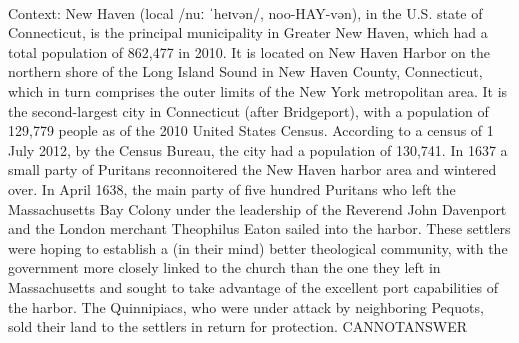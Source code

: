 \documentclass[11pt,a4paper, onecolumn]{article}
\begin{document}
\\ Context: New Haven (local /nuː ˈheɪvən/, noo-HAY-vən), in the U.S. state of Connecticut, is the principal municipality in Greater New Haven, which had a total population of 862,477 in 2010. It is located on New Haven Harbor on the northern shore of the Long Island Sound in New Haven County, Connecticut, which in turn comprises the outer limits of the New York metropolitan area. It is the second-largest city in Connecticut (after Bridgeport), with a population of 129,779 people as of the 2010 United States Census. According to a census of 1 July 2012, by the Census Bureau, the city had a population of 130,741. In 1637 a small party of Puritans reconnoitered the New Haven harbor area and wintered over. In April 1638, the main party of five hundred Puritans who left the Massachusetts Bay Colony under the leadership of the Reverend John Davenport and the London merchant Theophilus Eaton sailed into the harbor. These settlers were hoping to establish a (in their mind) better theological community, with the government more closely linked to the church than the one they left in Massachusetts and sought to take advantage of the excellent port capabilities of the harbor. The Quinnipiacs, who were under attack by neighboring Pequots, sold their land to the settlers in return for protection. CANNOTANSWER
\end{document}

